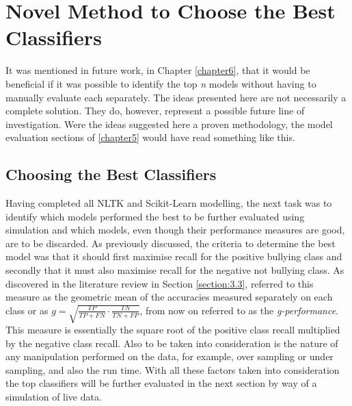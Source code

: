 
\chapter{Novel Method to Choose the Best Classifiers} %

\label{AppendixB} %


It was mentioned in future work, in Chapter \ref{chapter6}, that it would be beneficial if it was possible to identify the top \textit{n} models without having to manually evaluate each separately. The ideas presented here are not necessarily a complete solution. They do, however, represent a possible future line of investigation. Were the ideas suggested here a proven methodology, the model evaluation sections of \ref{chapter5} would have read something like this.

\section{Choosing the Best Classifiers}

Having completed all NLTK and Scikit-Learn modelling, the next task was to identify which models performed the best to be further evaluated using simulation and which models, even though their performance measures are good, are to be discarded. As previously discussed, the criteria to determine the best model was that it should first maximise recall for the positive bullying class and secondly that it must also maximise recall for the negative not bullying class. As discovered in the literature review in Section \ref{section:3.3}, \citet{kubat_addressing_1997} referred to this measure as the geometric mean of the accuracies measured separately on each class or as $g =\sqrt{\frac{TP}{TP + FN} \cdot \frac{TN}{TN + FP}}$, from now on referred to as the \textit{g-performance}. This measure is essentially the square root of the positive class recall multiplied by the negative class recall. Also to be taken into consideration is the nature of any manipulation performed on the data, for example, over sampling or under sampling, and also the run time. With all these factors taken into consideration the top classifiers will be further evaluated in the next section by way of a simulation of live data.

